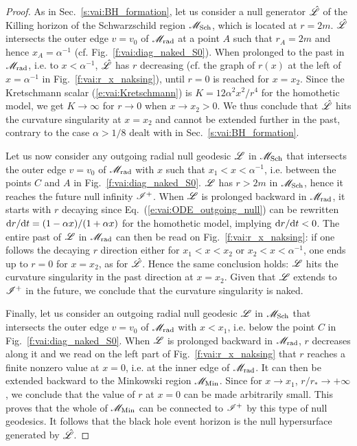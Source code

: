 \begin{proof}
As in Sec.~\ref{s:vai:BH_formation}, let us consider a null generator
$\hat{\mathscr{L}}$ of the Killing horizon of the Schwarzschild region
$\mathscr{M}_{\rm Sch}$, which is located at $r=2m$.
$\hat{\mathscr{L}}$ intersects the outer edge $v=v_0$ of $\mathscr{M}_{\rm rad}$ at a
point $A$ such that $r_A=2m$ and hence $x_A=\alpha^{-1}$ (cf. Fig.~\ref{f:vai:diag_naked_S0}). When
prolonged to the past in $\mathscr{M}_{\rm rad}$, i.e. to $x < \alpha^{-1}$,
$\hat{\mathscr{L}}$ has $r$ decreasing (cf. the graph of $r(x)$ at the left of
$x=\alpha^{-1}$ in Fig.~\ref{f:vai:r_x_naksing}), until $r=0$ is reached for
$x=x_2$. Since the Kretschmann scalar (\ref{e:vai:Kretschmann}) is
$K = 12 \alpha^2 x^2 / r^4$ for the homothetic model, we get $K\to \infty$
for $r\to 0$ when $x\to x_2 > 0$. We thus conclude that $\hat{\mathscr{L}}$ hits
the curvature singularity at $x=x_2$ and cannot be extended further in the
past, contrary to the case $\alpha > 1/8$ dealt with in Sec.~\ref{s:vai:BH_formation}.

Let us now consider any outgoing radial null geodesic $\mathscr{L}$ in $\mathscr{M}_{\rm Sch}$
that intersects the outer edge $v=v_0$ of $\mathscr{M}_{\rm rad}$ with
$x$ such that $x_1 < x < \alpha^{-1}$, i.e. between the points $C$ and $A$
in Fig.~\ref{f:vai:diag_naked_S0}. $\mathscr{L}$ has $r> 2m$ in $\mathscr{M}_{\rm Sch}$,
hence it reaches the future null infinity $\mathscr{I}^+$. When $\mathscr{L}$
is prolonged backward in $\mathscr{M}_{\rm rad}$, it starts with
$r$ decaying since
Eq.~(\ref{e:vai:ODE_outgoing_null}) can be rewritten $\mathrm{d} r/\mathrm{d} t = (1 - \alpha x)/(1 + \alpha x)$
for the homothetic model, implying $\mathrm{d} r / \mathrm{d} t <0$. The entire past of $\mathscr{L}$ in $\mathscr{M}_{\rm rad}$ can then be read on Fig.~\ref{f:vai:r_x_naksing}: if one
follows the decaying $r$ direction either for $x_1 < x < x_2$ or $x_2 < x < \alpha^{-1}$,
one ends up to $r=0$ for $x=x_2$, as for $\hat{\mathscr{L}}$. Hence the same conclusion holds:
$\mathscr{L}$ hits the curvature singularity in the past direction at $x=x_2$.
Given that $\mathscr{L}$ extends to $\mathscr{I}^+$ in the future, we conclude that
the curvature singularity is naked.

Finally, let us consider an outgoing radial null geodesic $\mathscr{L}$ in $\mathscr{M}_{\rm Sch}$ that intersects the outer edge $v=v_0$ of $\mathscr{M}_{\rm rad}$ with
$x < x_1$, i.e. below the point $C$ in Fig.~\ref{f:vai:diag_naked_S0}. When $\mathscr{L}$ is prolonged backward in $\mathscr{M}_{\rm rad}$, $r$ decreases along it
and we read on the left part of Fig.~\ref{f:vai:r_x_naksing} that $r$ reaches
a finite nonzero value at $x=0$, i.e. at the inner edge of $\mathscr{M}_{\rm rad}$. It can then be extended backward to the Minkowski region $\mathscr{M}_{\rm Min}$.
Since for $x\to x_1$, $r/r_*\to +\infty$, we conclude that the value of $r$
at $x=0$ can be made arbitrarily small. This proves that the whole of $\mathscr{M}_{\rm Min}$ can be connected to $\mathscr{I}^+$ by this type of null geodesics. It follows
that the black hole event horizon is the null hypersurface generated by $\hat{\mathscr{L}}$.
\end{proof}

